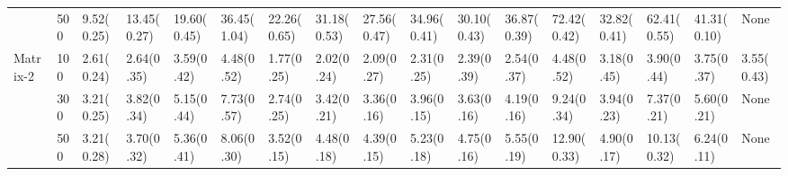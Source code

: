 \begin{table}[H]
{\begin{tabular}{ll|p{2cm}p{2cm}p{2cm}p{2cm}p{2cm}p{2cm}p{2cm}p{2cm}p{2cm}p{2cm}p{2cm}p{2cm}p{2cm}p{2cm}p{2cm}}
              & 500 &                        9.52(0.25) &                         13.45(0.27) &                         19.60(0.45) &                         36.45(1.04) &                                           22.26(0.65) &                                             31.18(0.53) &                                             27.56(0.47) &                                               34.96(0.41) &                                             30.10(0.43) &                                               36.87(0.39) &  72.42(0.42) &    32.82(0.41) &    62.41(0.55) &   41.31(0.10) &             None \\
Matrix-2 & 100 &                        2.61(0.24) &                          2.64(0.35) &                          3.59(0.42) &                          4.48(0.52) &                                            1.77(0.25) &                                              2.02(0.24) &                                              2.09(0.27) &                                                2.31(0.25) &                                              2.39(0.39) &                                                2.54(0.37) &   4.48(0.52) &     3.18(0.45) &     3.90(0.44) &    3.75(0.37) &       3.55(0.43) \\
              & 300 &                        3.21(0.25) &                          3.82(0.34) &                          5.15(0.44) &                          7.73(0.57) &                                            2.74(0.25) &                                              3.42(0.21) &                                              3.36(0.16) &                                                3.96(0.15) &                                              3.63(0.16) &                                                4.19(0.16) &   9.24(0.34) &     3.94(0.23) &     7.37(0.21) &    5.60(0.21) &             None \\
              & 500 &                        3.21(0.28) &                          3.70(0.32) &                          5.36(0.41) &                          8.06(0.30) &                                            3.52(0.15) &                                              4.48(0.18) &                                              4.39(0.15) &                                                5.23(0.18) &                                              4.75(0.16) &                                                5.55(0.19) &  12.90(0.33) &     4.90(0.17) &    10.13(0.32) &    6.24(0.11) &             None \\
\bottomrule
\end{tabular}
}
\end{table}
